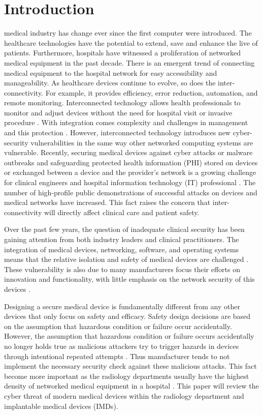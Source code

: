 \documentclass{IEEEtran}
\begin{document}
\section{Introduction}
 medical industry has change ever since the first computer were introduced. The healthcare technologies have the potential to extend, save and enhance the live of patients. Furthermore, hospitals have witnessed a proliferation of networked medical equipment in the past decade. There is an emergent trend of connecting medical equipment to the hospital network for easy accessibility and manageability. As healthcare devices continue to evolve, so does the inter-connectivity. For example, it provides efficiency, error reduction, automation, and remote monitoring. Interconnected technology allows health professionals to monitor and adjust devices without the need for hospital visit or invasive procedure \cite{coventry2018cybersecurity}. With integration comes complexity and challenges in management and this protection \cite{williams2015cybersecurity}. However, interconnected technology introduces new cyber-security vulnerabilities in the same way other networked computing systems are vulnerable. Recently, securing medical devices against cyber attacks or malware outbreaks and safeguarding protected health information (PHI) stored on devices or exchanged between a device and the provider's network is a growing challenge for clinical engineers and hospital information technology (IT) professional \cite{wirth2011cybercrimes}. The number of high-profile public demonstrations of successful attacks on devices and medical networks have increased. This fact raises the concern that inter-connectivity will directly affect clinical care and patient safety. \par
Over the past few years, the question of inadequate clinical security has been gaining attention from both industry leaders and clinical practitioners. The integration of medical devices, networking, software, and operating systems means that the relative isolation and safety of medical devices are challenged \cite{williams2015cybersecurity}. These vulnerability is also due to many manufacturers focus their efforts on innovation and functionality, with little emphasis on the network security of this devices \cite{moses2015lack}. \par
Designing a secure medical device is fundamentally different from  any other devices that only focus on safety and efficacy. Safety design decisions are based on the assumption that hazardous condition or failure occur accidentally. However, the assumption that hazardous condition or failure occurs accidentally no longer holds true as malicious attackers try to trigger hazards in devices through intentional repeated attempts \cite{Ray}. Thus manufacturer tends to not implement the necessary security check against these malicious attacks. This fact become more important as the radiology departments usually have the highest density of networked medical equipment in a hospital \cite{moses2015lack}. This paper will review the cyber threat of modern medical devices within the radiology department and implantable medical devices (IMDs).
\end{document}
